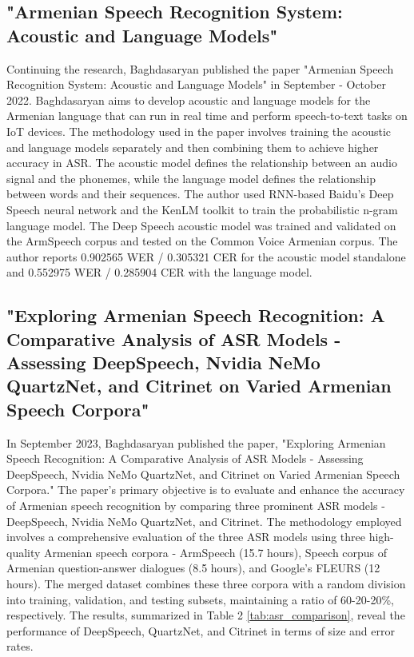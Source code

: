 \documentclass[conference]{IEEEtran}
\begin{document}
\subsection{"Armenian Speech Recognition System: Acoustic and Language Models" \cite{author2023armenian}}
Continuing the research, Baghdasaryan published the paper "Armenian Speech Recognition System: Acoustic and Language Models" in September - October 2022. Baghdasaryan aims to develop acoustic and language models for the Armenian language that can run in real time and perform speech-to-text tasks on IoT devices. The methodology used in the paper involves training the acoustic and language models separately and then combining them to achieve higher accuracy in ASR. The acoustic model defines the relationship between an audio signal and the phonemes, while the language model defines the relationship between words and their sequences. The author used RNN-based Baidu's Deep Speech neural network and the KenLM toolkit to train the probabilistic n-gram language model. The Deep Speech acoustic model was trained and validated on the ArmSpeech corpus and tested on the Common Voice Armenian corpus. The author reports 0.902565 WER / 0.305321 CER for the acoustic model standalone and 0.552975 WER / 0.285904 CER with the language model.

\subsection{"Exploring Armenian Speech Recognition: A Comparative Analysis of ASR Models - Assessing DeepSpeech, Nvidia NeMo QuartzNet, and Citrinet on Varied Armenian Speech Corpora" \cite{inproceedings}}
In September 2023, Baghdasaryan published the paper, "Exploring Armenian Speech Recognition: A Comparative Analysis of ASR Models - Assessing DeepSpeech, Nvidia NeMo QuartzNet, and Citrinet on Varied Armenian Speech Corpora." The paper's primary objective is to evaluate and enhance the accuracy of Armenian speech recognition by comparing three prominent ASR models - DeepSpeech, Nvidia NeMo QuartzNet, and Citrinet. The methodology employed involves a comprehensive evaluation of the three ASR models using three high-quality Armenian speech corpora - ArmSpeech (15.7 hours), Speech corpus of Armenian question-answer dialogues (8.5 hours), and Google's FLEURS (12 hours). The merged dataset combines these three corpora with a random division into training, validation, and testing subsets, maintaining a ratio of 60-20-20\%, respectively. The results, summarized in Table 2 \ref{tab:asr_comparison}, reveal the performance of DeepSpeech, QuartzNet, and Citrinet in terms of size and error rates.
\end{document}
